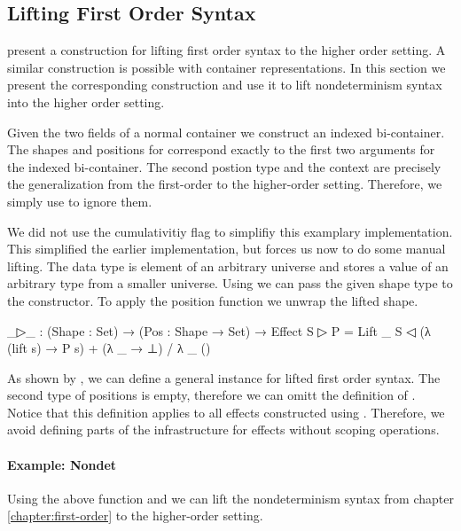\subsection{Lifting First Order Syntax}
\label{higher-order:lifting}

\textcite{DBLP:conf/haskell/WuSH14} present a construction for lifting first
order syntax to the higher order setting.
A similar construction is possible with container representations.
In this section we present the corresponding construction and use it to
lift nondeterminism syntax into the higher order setting. 

Given the two fields of a normal container we construct an indexed bi-container.
The shapes and positions for  correspond exactly to the first
two arguments for the indexed bi-container.
The second postion type and the context are precisely the generalization from
the first-order to the higher-order setting.
Therefore, we simply use  to ignore them.

We did not use the cumulativitiy flag to simplifiy this examplary implementation.
This simplified the earlier implementation, but forces us now to do some manual
lifting.
The  data type is element of an arbitrary universe and stores
a value of an arbitrary type from a smaller universe.
Using  we can pass the given shape type to the constructor.
To apply the position function we unwrap the lifted shape.

\begin{code}
_▷_ : (Shape : Set) → (Pos : Shape → Set) → Effect
S ▷ P = Lift _ S ◁ (λ (lift s) → P s) + (λ _ → ⊥) / λ _ ()
\end{code}
As shown by \textcite{DBLP:conf/haskell/WuSH14}, we can define a general
 instance for lifted first order syntax.
The second type of positions is empty, therefore we can omitt the definition of
.
Notice that this definition applies to all effects constructed using
.
Therefore, we avoid defining parts of the infrastructure for effects without
scoping operations.


\paragraph{Example: Nondet}
Using the above function and  we can lift the
nondeterminism syntax from chapter \ref{chapter:first-order} to the higher-order
setting.

